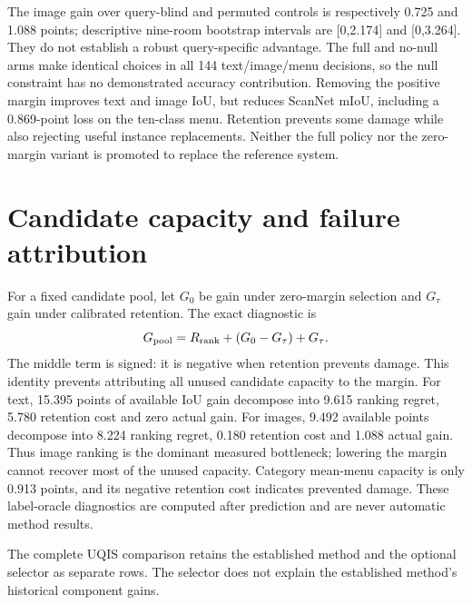 The image gain over query-blind and permuted controls is respectively 0.725 and
1.088 points; descriptive nine-room bootstrap intervals are [0,2.174] and
[0,3.264]. They do not establish a robust query-specific advantage. The full
and no-null arms make identical choices in all 144 text/image/menu decisions,
so the null constraint has no demonstrated accuracy contribution. Removing the
positive margin improves text and image IoU, but reduces ScanNet mIoU, including
a 0.869-point loss on the ten-class menu. Retention prevents some damage while
also rejecting useful instance replacements. Neither the full policy nor the
zero-margin variant is promoted to replace the reference system.

\section{Candidate capacity and failure attribution}
For a fixed candidate pool, let $G_0$ be gain under zero-margin selection and
$G_\tau$ gain under calibrated retention. The exact diagnostic is
\[
G_{\rm pool}=R_{\rm rank}+(G_0-G_\tau)+G_\tau.
\]
The middle term is signed: it is negative when retention prevents damage.
This identity prevents attributing all unused candidate capacity to the margin.
For text, 15.395 points of available IoU gain decompose into 9.615 ranking regret,
5.780 retention cost and zero actual gain. For images, 9.492 available points
decompose into 8.224 ranking regret, 0.180 retention cost and 1.088 actual gain.
Thus image ranking is the dominant measured bottleneck; lowering the margin
cannot recover most of the unused capacity. Category mean-menu capacity is
only 0.913 points, and its negative retention cost indicates prevented damage.
These label-oracle diagnostics are computed after prediction and are never
automatic method results.


\begin{center}
\resizebox{\linewidth}{!}{}
\end{center}
The complete UQIS comparison retains the established method and the optional
selector as separate rows. The selector does not explain the established
method's historical component gains.
